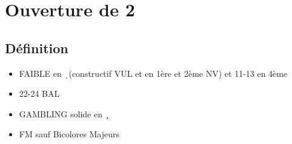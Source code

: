 \documentclass[a4paper]{article}
\begin{document}
\section{Ouverture de 2\pdfc}

\subsection{Définition}

\begin{itemize}
\item FAIBLE en \d\ (constructif VUL et en 1ère et 2ème NV) et 11-13 en 4ème

\item 22-24 BAL

\item GAMBLING solide en \c\ 

\item FM sauf Bicolores Majeurs

\end{itemize}
\end{document}
